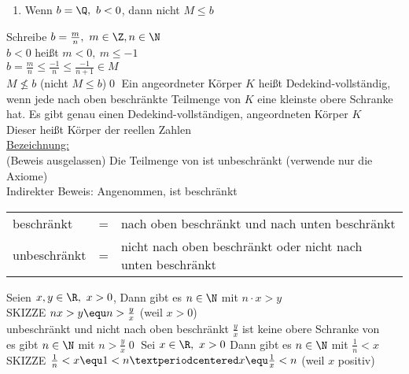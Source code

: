 \begin{enumerate}
\begin{enumerate}
\item {Wenn $b=\Q,\ b<0$, dann nicht $M\leq b$}
\end{enumerate}
Schreibe $b=\frac{m}{n},\ m\in\Z, n\in\N$\\[1ex]
$b<0$ heißt $m<0,\ m\leq -1$\\[1ex]
$b=\frac{m}{n} \leq \frac{-1}{n} \leq \frac{-1}{n+1}\in M$\\[1ex]
\Rarr{} $M\not\leq b$ (nicht $M\leq b$)\qed
%
\Def
Ein angeordneter Körper $K$ heißt Dedekind-vollständig, wenn jede nach oben beschränkte Teilmenge von $K$ eine kleinste obere Schranke hat.
\Satz
Es gibt genau einen Dedekind-vollständigen, angeordneten Körper $K$\\
Dieser heißt Körper der reellen Zahlen\\
\underline{Bezeichnung:} \R\\
(Beweis ausgelassen)
%
\Satz
Die Teilmenge \N{} von \R{} ist unbeschränkt
\bew
(verwende nur die Axiome)\\
Indirekter Beweis: Angenommen, \N{} ist beschränkt\\
\begin{tabular}{lcl}
beschränkt &=& nach oben beschränkt und nach unten beschränkt\\
unbeschränkt &=& nicht nach oben beschränkt oder nicht nach unten beschränkt
\end{tabular}
%
Seien $x,y\in\R,\ x>0$, Dann gibt es $n\in\N$ mit $n·x>y$\\
SKIZZE %
%
\bew
$nx>y \equ n>\frac{y}{x}$ (weil $x>0$)\\
\N{} unbeschränkt und nicht nach oben beschränkt \Rarr{} $\frac{y}{x}$ ist keine obere Schranke von \N\\
\Rarr{} es gibt $n\in\N$ mit $n>\frac{y}{x}$\qed
%
Sei $x\in\R,\ x>0$ Dann gibt es $n\in\N$ mit $\frac{1}{n}<x$\\
SKIZZE %
\bew
$\frac{1}{n}<x \equ 1<n·x \equ \frac{1}{x}<n$ (weil $x$ positiv)\\

\end{enumerate}

